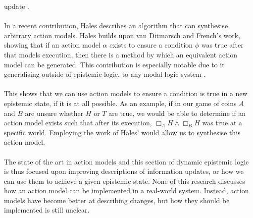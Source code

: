 \documentclass[12pt, a4paper, titlepage]{scrartcl}
\begin{document}
update \cite{van2009simulation,van2010future}.\\
\\
In a recent contribution, Hales describes an algorithm that can synthesise arbitrary
action models.
Hales builds upon van Ditmarsch and French's work, showing that if an action
model $\alpha$ exists to ensure a condition $\phi$ was true after that models
execution, then there is a method by which an equivalent action model can be generated.
This contribution is especially notable due to it generalising outside of
epistemic logic, to any modal logic system \cite{hales13synthesis}.\\
\\
This shows that we can use action models to ensure a condition is true
in a new epistemic state, if it is at all possible.
As an example, if in our game of coins $A$ and $B$ are unsure whether $H$ or $T$
are true, we would be able to determine if an action model exists such that
after its execution, $\Box_A H \land \Box_B H$ was true at a
specific world.
Employing the work of Hales' would allow us to synthesise this action model.\\
\\
The state of the art in action models and this section of dynamic epistemic
logic is thus focused upon improving descriptions of information updates, or how
we can use them to achieve a given epistemic state.
None of this research discusses how an action model can be implemented in a
real-world system.
Instead, action models have become better at describing changes, but how they
should be implemented is still unclear.
\end{document}
